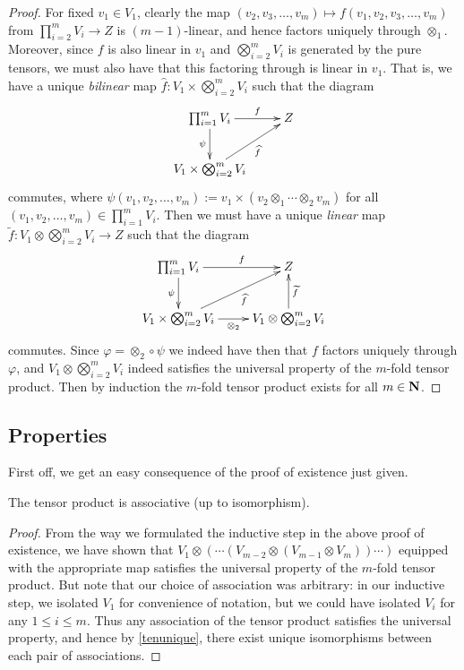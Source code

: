 \begin{pro}
\begin{proof}
    For fixed $v_1 \in V_1$, clearly the map $(v_2,v_3,\ldots,v_m)
    \mapsto f(v_1,v_2,v_3,\ldots,v_m)$ from $\prod_{i=2}^m V_i \to Z$
    is $(m-1)$-linear, and hence factors uniquely through
    $\otimes_1$. Moreover, since $f$ is also linear in $v_1$ and
    $\bigotimes_{i=2}^m V_i$ is generated by the pure tensors, we must
    also have that this factoring through is linear in $v_1$. That is,
    we have a unique \emph{bilinear} map $\hat f : V_1 \times
    \bigotimes_{i=2}^m V_i$ such that the diagram
    \[ \xymatrix{ \prod_{i=1}^m V_i \ar[r]^-{f} \ar[d]_{\psi} & Z \\
      V_1 \times \bigotimes_{i=2}^m V_i \ar[ur]_-{\hat f} } \]
    commutes, where $\psi(v_1,v_2,\ldots,v_m) := v_1 \times (v_2
    \otimes_1 \cdots \otimes_2 v_m)$ for all $(v_1,v_2,\ldots,v_m) \in
    \prod_{i=1}^m V_i$. Then we must have a unique \emph{linear} map
    $\tilde f : V_1 \otimes \bigotimes_{i=2}^m V_i \to Z$ such that
    the diagram
    \[ \xymatrix{ \prod_{i=1}^m V_i \ar[r]^-{f} \ar[d]_{\psi} & Z \\
      V_1 \times \bigotimes_{i=2}^m V_i \ar[ur]_-{\hat f}
      \ar[r]_-{\otimes_2} & V_1 \otimes \bigotimes_{i=2}^m V_i
      \ar[u]_-{\tilde f} } \] commutes. Since $\varphi = \otimes_2
    \circ \psi$ we indeed have then that $f$ factors uniquely through
    $\varphi$, and $V_1 \otimes \bigotimes_{i=2}^m V_i$ indeed
    satisfies the universal property of the $m$-fold tensor
    product. Then by induction the $m$-fold tensor product exists for
    all $m \in \boldsymbol{\mathbf{N}}$.
  \end{proof}
\end{pro}

\subsection{Properties}

First off, we get an easy consequence of the proof of existence just
given.
\begin{cor}
  The tensor product is associative (up to isomorphism).
  \begin{proof}
    From the way we formulated the inductive step in the above proof
    of existence, we have shown that $V_1 \otimes (\cdots(V_{m-2}
    \otimes (V_{m-1} \otimes V_m))\cdots)$ equipped with the
    appropriate map satisfies the universal property of the $m$-fold
    tensor product. But note that our choice of association was
    arbitrary: in our inductive step, we isolated $V_1$ for
    convenience of notation, but we could have isolated $V_i$ for any
    $1 \le i \le m$. Thus any association of the tensor product
    satisfies the universal property, and hence by \ref{tenunique},
    there exist unique isomorphisms between each pair of associations.
  \end{proof}
\end{cor}

